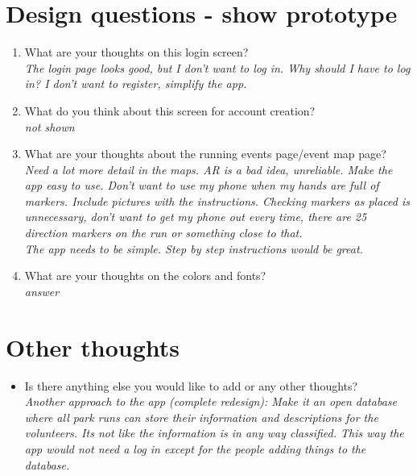 \documentclass{article}
\begin{document}
\newpage
\section*{Design questions - show prototype}
\begin{enumerate}[label=\textbf{Question \arabic*:}]
    \item What are your thoughts on this login screen?\\
        \textit{The login page looks good, but I don't want to log in. Why should I have to log in? I don't want to register, simplify the app.}
    \item What do you think about this screen for account creation?\\
        \textit{not shown}
    \item What are your thoughts about the running events page/event map page?\\
        \textit{Need a lot more detail in the maps. AR is a bad idea, unreliable. Make the app easy to use. Don't want to use my phone when my hands are full of markers. Include pictures with the instructions. Checking markers as placed is unnecessary, don't want to get my phone out every time, there are 25 direction markers on the run or something close to that. \\
        The app needs to be simple. Step by step instructions would be great. }
    \item What are your thoughts on the colors and fonts?\\
        \textit{answer}
\end{enumerate}

\section*{Other thoughts}
\begin{itemize}[label=]
    \item Is there anything else you would like to add or any other thoughts?\\
    \textit{Another approach to the app (complete redesign): Make it an open  database where all park runs can store their information and descriptions for the volunteers. Its not like the information is in any way classified. This way the app would not need a log in except for the people adding things to the database.}
\end{itemize}
\thispagestyle{empty}
\end{document}
